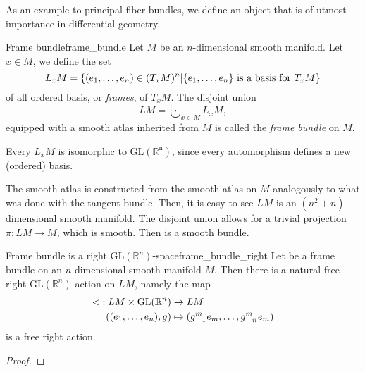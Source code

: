 As an example to principal fiber bundles, we define an object that is of utmost importance in differential geometry.
\begin{definition}{Frame bundle}{frame_bundle}
    Let \(M\) be an \(n\)-dimensional smooth manifold. Let \(x \in M\), we define the set
    \begin{equation*}
        L_xM = \set*{\left(e_1, \dots, e_n\right) \in (T_xM)^n | \set*{e_1, \dots, e_n} \text{ is a basis for } T_xM}
    \end{equation*}
    of all ordered basis, or \emph{frames}, of \(T_xM\). The disjoint union
    \begin{equation*}
        LM = \bigcupdot_{x \in M} L_xM,
    \end{equation*}
    equipped with a smooth atlas inherited from \(M\) is called the \emph{frame bundle} on \(M\).
\end{definition}
\begin{remark}
    Every \(L_xM\) is isomorphic to \(\mathrm{GL(\mathbb{R}^n)}\), since every automorphism defines a new (ordered) basis.
\end{remark}
\begin{remark}
    The smooth atlas is constructed from the smooth atlas on \(M\) analogously to what was done with the tangent bundle. Then, it is easy to see \(LM\) is an \((n^2 + n)\)-dimensional smooth manifold. The disjoint union allows for a trivial projection \(\pi : LM \to M\), which is smooth. Then  is a smooth bundle.
\end{remark}

\begin{lemma}{Frame bundle is a right \(\mathrm{GL}(\mathbb{R}^n)\)-space}{frame_bundle_right}
    Let  be a frame bundle on an \(n\)-dimensional smooth manifold \(M\). Then there is a natural free right \(\mathrm{GL}(\mathbb{R}^n)\)-action on \(LM\), namely the map
    \begin{align*}
        \ract : LM \times \mathrm{GL}(\mathbb{R}^n) &\to LM\\
                           \left((e_1,\dots,e_n),g\right) &\mapsto (g\indices{^m_1}e_m, \dots, g\indices{^m_n}e_m)
    \end{align*}
    is a free right action.
\end{lemma}
\begin{proof}
    \todo
\end{proof}

